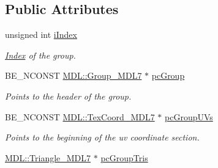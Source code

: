 \subsection*{Public Attributes}
\begin{DoxyCompactItemize}
\item 
\hypertarget{struct_assimp_1_1_m_d_l_1_1_int_group_info___m_d_l7_a04ccc75a9baf3eed16a9eccc76967652}{unsigned int \hyperlink{struct_assimp_1_1_m_d_l_1_1_int_group_info___m_d_l7_a04ccc75a9baf3eed16a9eccc76967652}{i\+Index}}\label{struct_assimp_1_1_m_d_l_1_1_int_group_info___m_d_l7_a04ccc75a9baf3eed16a9eccc76967652}

\begin{DoxyCompactList}\small\item\em \hyperlink{struct_index}{Index} of the group. \end{DoxyCompactList}\item 
\hypertarget{struct_assimp_1_1_m_d_l_1_1_int_group_info___m_d_l7_acdf3fc8b2b7e8808e3693bc2963ad9b2}{B\+E\+\_\+\+N\+C\+O\+N\+S\+T \hyperlink{struct_assimp_1_1_m_d_l_1_1_group___m_d_l7}{M\+D\+L\+::\+Group\+\_\+\+M\+D\+L7} $\ast$ \hyperlink{struct_assimp_1_1_m_d_l_1_1_int_group_info___m_d_l7_acdf3fc8b2b7e8808e3693bc2963ad9b2}{pc\+Group}}\label{struct_assimp_1_1_m_d_l_1_1_int_group_info___m_d_l7_acdf3fc8b2b7e8808e3693bc2963ad9b2}

\begin{DoxyCompactList}\small\item\em Points to the header of the group. \end{DoxyCompactList}\item 
\hypertarget{struct_assimp_1_1_m_d_l_1_1_int_group_info___m_d_l7_a5f1b29e16fed79b7a3f3a93245af004b}{B\+E\+\_\+\+N\+C\+O\+N\+S\+T \hyperlink{struct_assimp_1_1_m_d_l_1_1_tex_coord___m_d_l7}{M\+D\+L\+::\+Tex\+Coord\+\_\+\+M\+D\+L7} $\ast$ \hyperlink{struct_assimp_1_1_m_d_l_1_1_int_group_info___m_d_l7_a5f1b29e16fed79b7a3f3a93245af004b}{pc\+Group\+U\+Vs}}\label{struct_assimp_1_1_m_d_l_1_1_int_group_info___m_d_l7_a5f1b29e16fed79b7a3f3a93245af004b}

\begin{DoxyCompactList}\small\item\em Points to the beginning of the uv coordinate section. \end{DoxyCompactList}\item 
\hypertarget{struct_assimp_1_1_m_d_l_1_1_int_group_info___m_d_l7_aa3eb1080b9cb200056698f682c57373f}{\hyperlink{struct_assimp_1_1_m_d_l_1_1_triangle___m_d_l7}{M\+D\+L\+::\+Triangle\+\_\+\+M\+D\+L7} $\ast$ \hyperlink{struct_assimp_1_1_m_d_l_1_1_int_group_info___m_d_l7_aa3eb1080b9cb200056698f682c57373f}{pc\+Group\+Tris}}\label{struct_assimp_1_1_m_d_l_1_1_int_group_info___m_d_l7_aa3eb1080b9cb200056698f682c57373f}


\end{DoxyCompactItemize}

